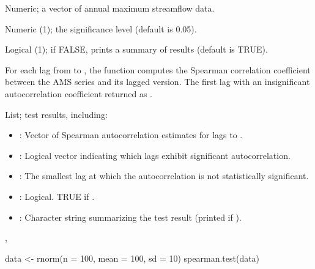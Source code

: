 \documentclass[a4paper]{book}
\begin{document}
%
\begin{Arguments}
\begin{ldescription}
\item[\code{data}] Numeric; a vector of annual maximum streamflow data.

\item[\code{alpha}] Numeric (1); the significance level (default is 0.05).

\item[\code{quiet}] Logical (1); if FALSE, prints a summary of results (default is TRUE).
\end{ldescription}
\end{Arguments}
%
\begin{Details}
For each lag from  to , the function computes the Spearman correlation
coefficient between the AMS series and its lagged version. The first lag with an
insignificant autocorrelation coefficient returned as .
\end{Details}
%
\begin{Value}
List; test results, including:
\begin{itemize}

\item{} : Vector of Spearman autocorrelation estimates for lags  to .
\item{} : Logical vector indicating which lags exhibit significant autocorrelation.
\item{} : The smallest lag at which the autocorrelation is not statistically significant.
\item{} : Logical. TRUE if .
\item{} : Character string summarizing the test result (printed if ).

\end{itemize}

\end{Value}
%
\begin{SeeAlso}
, 
\end{SeeAlso}
%
\begin{Examples}
\begin{ExampleCode}
data <- rnorm(n = 100, mean = 100, sd = 10)
spearman.test(data)

\end{ExampleCode}
\end{Examples}
\end{document}
